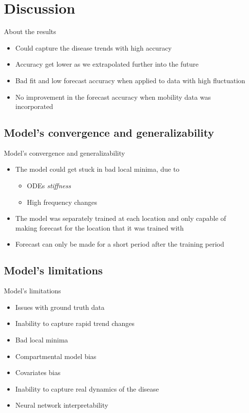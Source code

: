 \section{Discussion}

\begin{frame}{About the results}
    \begin{itemize}
        \item<1-> Could capture the disease trends with high accuracy
        \item<2-> Accuracy get lower as we extrapolated further into the future
        \item<3-> Bad fit and low forecast accuracy when applied to data with high fluctuation
        \item<4-> No improvement in the forecast accuracy when mobility data was incorporated
    \end{itemize}
\end{frame}

\subsection{Model's convergence and generalizability}

\begin{frame}{Model's convergence and generalizability}
    \begin{itemize}
        \item<1-> The model could get stuck in bad local minima, due to
        \begin{itemize}
            \item \glspl{ODE} \textit{stiffness}
            \item High frequency changes
        \end{itemize}
        \item<2-> The model was separately trained at each location and only capable of making forecast for the location that it was trained with
        \item<3-> Forecast can only be made for a short period after the training period
    \end{itemize}
\end{frame}

\subsection{Model's limitations}

\begin{frame}{Model's limitations}
    \begin{itemize}
        \item<1-> Issues with ground truth data
        \item<2-> Inability to capture rapid trend changes
        \item<3-> Bad local minima
        \item<4-> Compartmental model bias
        \item<5-> Covariates bias
        \item<6-> Inability to capture real dynamics of the disease
        \item<7-> Neural network interpretability
    \end{itemize}
\end{frame}